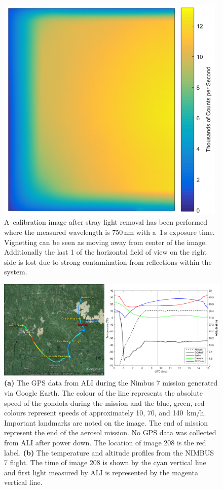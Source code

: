 \documentclass[amtd, online, hvmath]{copernicus}
\begin{document}
\begin{figure}
\includegraphics[height=110mm]{amt-2015-329-discussions-f07.pdf}
\caption{A~calibration image after stray light removal has been
  performed where the measured wavelength is 750\,\unit{nm} with
  a~1\,s exposure time.  Vignetting can be seen as moving away from
  center of the image. Additionally the last 1{\degree} of the
  horizontal field of view on the right side is lost due to strong
  contamination from reflections within the system.}
\label{amtd-2015-0329-f07.pdf}
\end{figure}

\begin{figure}
\includegraphics[width=120mm]{amt-2015-329-discussions-f08.pdf}
\caption{\textbf{(a)} The GPS data from ALI during the Nimbus 7
  mission generated via Google Earth. The colour of the line
  represents the absolute speed of the gondola during the
  mission and the blue, green, red colours represent speeds of approximately
  10, 70, and 140~km/h. Important landmarks are noted on the image.  The end of
  mission represent the end of the aerosol mission. No GPS data was
  collected from ALI after power down. The location of image 208 is
  the red label. \textbf{(b)} The temperature and altitude profiles
  from the NIMBUS 7 flight.  The time of image 208 is shown by the
  cyan vertical line and first light measured by ALI is represented by the
  magenta vertical line.}
\label{amtd-2015-0329-f08.pdf}
\end{figure}
\end{document}
